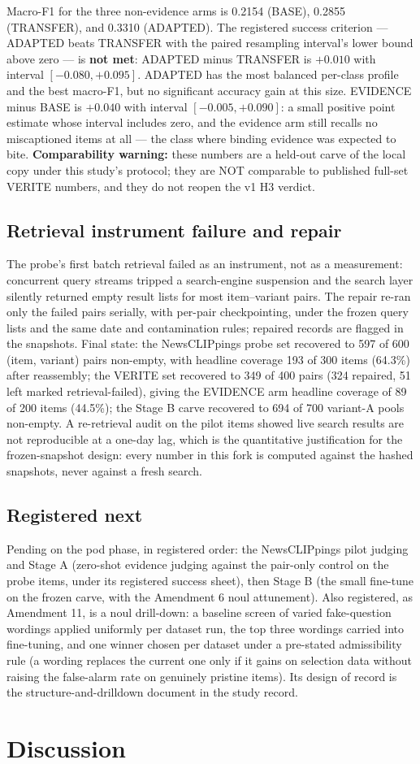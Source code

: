 \documentclass{article}
\begin{document}
Macro-F1 for the three non-evidence arms is 0.2154 (BASE), 0.2855
(TRANSFER), and 0.3310 (ADAPTED). The registered success criterion ---
ADAPTED beats TRANSFER with the paired resampling interval's lower
bound above zero --- is \textbf{not met}: ADAPTED minus TRANSFER is
$+0.010$ with interval $[-0.080, +0.095]$. ADAPTED has the most
balanced per-class profile and the best macro-F1, but no significant
accuracy gain at this size. EVIDENCE minus BASE is $+0.040$ with
interval $[-0.005, +0.090]$: a small positive point estimate whose
interval includes zero, and the evidence arm still recalls no
miscaptioned items at all --- the class where binding evidence was
expected to bite. \textbf{Comparability warning:} these numbers are a
held-out carve of the local copy under this study's protocol; they
are NOT comparable to published full-set VERITE numbers, and they do
not reopen the v1 H3 verdict.

\subsection{Retrieval instrument failure and repair}
The probe's first batch retrieval failed as an instrument, not as a
measurement: concurrent query streams tripped a search-engine
suspension and the search layer silently returned empty result lists
for most item--variant pairs. The repair re-ran only the failed pairs
serially, with per-pair checkpointing, under the frozen query lists
and the same date and contamination rules; repaired records are
flagged in the snapshots. Final state: the NewsCLIPpings probe set
recovered to 597 of 600 (item, variant) pairs non-empty, with
headline coverage 193 of 300 items (64.3\%) after reassembly; the
VERITE set recovered to 349 of 400 pairs (324 repaired, 51 left
marked retrieval-failed), giving the EVIDENCE arm headline coverage
of 89 of 200 items (44.5\%); the Stage B carve recovered to 694 of
700 variant-A pools non-empty. A re-retrieval audit on the pilot
items showed live search results are not reproducible at a one-day
lag, which is the quantitative justification for the frozen-snapshot
design: every number in this fork is computed against the hashed
snapshots, never against a fresh search.

\subsection{Registered next}
Pending on the pod phase, in registered order: the NewsCLIPpings
pilot judging and Stage A (zero-shot evidence judging against the
pair-only control on the probe items, under its registered success
sheet), then Stage B (the small fine-tune on the frozen carve, with
the Amendment 6 noul attunement). Also registered, as Amendment 11,
is a noul drill-down: a baseline screen of varied fake-question
wordings applied uniformly per dataset run, the top three wordings
carried into fine-tuning, and one winner chosen per dataset under a
pre-stated admissibility rule (a wording replaces the current one
only if it gains on selection data without raising the false-alarm
rate on genuinely pristine items). Its design of record is the
structure-and-drilldown document in the study record.
\section{Discussion}
\end{document}
